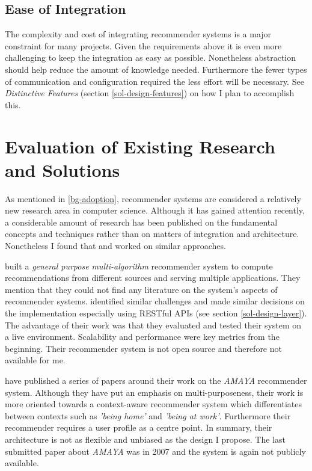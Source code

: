 \subsection{Ease of Integration}

The complexity and cost of integrating recommender systems is a major constraint for many projects. Given the requirements above it is even more challenging to keep the integration as easy as possible. Nonetheless abstraction should help reduce the amount of knowledge needed. Furthermore the fewer types of communication and configuration required the less effort will be necessary. See \emph{Distinctive Features} (section \ref{sol-design-features}) on how I plan to accomplish this.



\section{Evaluation of Existing Research and Solutions}
\label{prob-evaluation}

As mentioned in \ref{bg-adoption}, recommender systems are considered a relatively new research area in computer science. Although it has gained attention recently, a considerable amount of research has been published on the fundamental concepts and techniques rather than on matters of integration and architecture. Nonetheless I found that \citet{cortizo10} and \citet{rack07} worked on similar approaches.

\citet{cortizo10} built a \textit{general purpose multi-algorithm} recommender system to compute recommendations from different sources and serving multiple applications. They mention that they could not find any literature on the system's aspects of recommender systems. \citet{cortizo10} identified similar challenges and made similar decisions on the implementation especially using RESTful APIs (see section \ref{sol-design-layer}). The advantage of their work was that they evaluated and tested their system on a live environment. Scalability and performance were key metrics from the beginning. Their recommender system is not open source and therefore not available for me.

\citet{rack07} have published a series of papers around their work on the \emph{AMAYA} recommender system. Although they have put an emphasis on multi-purposeness, their work is more oriented towards a context-aware recommender system which differentiates between contexts such as \emph{'being home'} and \emph{'being at work'}. Furthermore their recommender requires a user profile as a centre point. In summary, their architecture is not as flexible and unbiased as the design I propose. The last submitted paper about \emph{AMAYA} was in 2007 and the system is again not publicly available.

